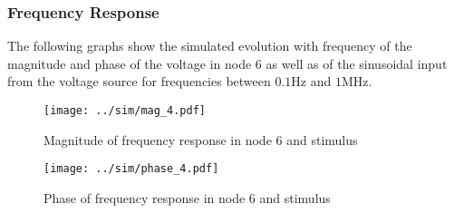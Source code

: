 \subsubsection{Frequency Response}

The following graphs show the simulated evolution with frequency of the magnitude and phase of the voltage in node 6 as well as of the sinusoidal input from the voltage source for frequencies between $0.1$Hz and $1$MHz.

\begin{figure}[H] \centering
\texttt{[image: ../sim/mag\_4.pdf]}
\caption{Magnitude of frequency response in node 6 and stimulus}
\label{fig:mag_sim}
\end{figure}


\begin{figure}[H] \centering
\texttt{[image: ../sim/phase\_4.pdf]}
\caption{Phase of frequency response in node 6 and stimulus}
\label{fig:phase_sim}
\end{figure}
